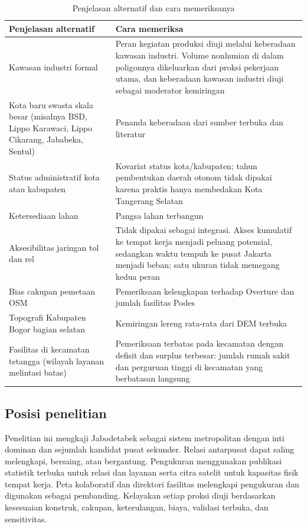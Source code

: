 \documentclass[12pt,a4paper,oneside,openany,indonesian]{report}
\begin{document}
\begin{table}[H]
\centering
\footnotesize
\caption{Penjelasan alternatif dan cara memeriksanya}
\label{tab:penjelasan-alternatif}
\begin{tabularx}{\textwidth}{>{\raggedright\arraybackslash}p{} >{\raggedright\arraybackslash}X}
\toprule
\textbf{Penjelasan alternatif} & \textbf{Cara memeriksa}\\
\midrule
Kawasan industri formal & Peran kegiatan produksi diuji melalui keberadaan kawasan industri. Volume nonhunian di dalam poligonnya dikeluarkan dari proksi pekerjaan utama, dan keberadaan kawasan industri diuji sebagai moderator kemiringan\\
Kota baru swasta skala besar (misalnya BSD, Lippo Karawaci, Lippo Cikarang, Jababeka, Sentul) & Penanda keberadaan dari sumber terbuka dan literatur\\
Status administratif kota atau kabupaten & Kovariat status kota/kabupaten; tahun pembentukan daerah otonom tidak dipakai karena praktis hanya membedakan Kota Tangerang Selatan\\
Ketersediaan lahan & Pangsa lahan terbangun\\
Aksesibilitas jaringan tol dan rel & Tidak dipakai sebagai integrasi. Akses kumulatif ke tempat kerja menjadi peluang potensial, sedangkan waktu tempuh ke pusat Jakarta menjadi beban; satu ukuran tidak memegang kedua peran\\
Bias cakupan pemetaan OSM & Pemeriksaan kelengkapan terhadap Overture dan jumlah fasilitas Podes\\
Topografi Kabupaten Bogor bagian selatan & Kemiringan lereng rata-rata dari DEM terbuka\\
Fasilitas di kecamatan tetangga (wilayah layanan melintasi batas) & Pemeriksaan terbatas pada kecamatan dengan defisit dan surplus terbesar: jumlah rumah sakit dan perguruan tinggi di kecamatan yang berbatasan langsung\\
\bottomrule
\end{tabularx}
\end{table}

\subsection{Posisi penelitian}

Penelitian ini mengkaji Jabodetabek sebagai sistem metropolitan dengan inti dominan dan sejumlah kandidat pusat sekunder. Relasi antarpusat dapat saling melengkapi, bersaing, atau bergantung. Pengukuran menggunakan publikasi statistik terbuka untuk relasi dan layanan serta citra satelit untuk kapasitas fisik tempat kerja. Peta kolaboratif dan direktori fasilitas melengkapi pengukuran dan digunakan sebagai pembanding. Kelayakan setiap proksi diuji berdasarkan kesesuaian konstruk, cakupan, keterulangan, biaya, validasi terbuka, dan sensitivitas.
\end{document}
